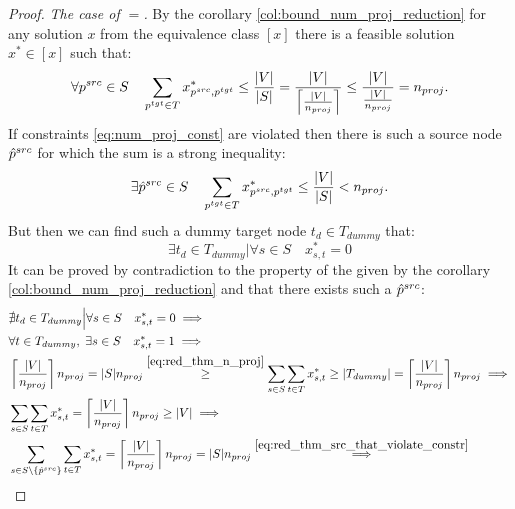 \begin{proof}
  \textit{The case of \( =\).} By the corollary \ref{col:bound_num_proj_reduction}
  for any solution \( x \) from the equivalence class \( [x] \) there is
  a feasible solution \( x^* \in [x] \) such that:
  \begin{equation} \label{eq:red_thm_n_proj}
    \forall p^{src} \in S \quad
    \sum\limits_{p^{tgt} \in T} x^*_{p^{src}, p^{tgt}} \leq \frac{|V|}{|S|} =
    \frac{|V|}{ \left\lceil \frac{|V|}{n_{proj}} \right\rceil} \leq \frac{|V|}{\frac{|V|}{n_{proj}}} =
    n_{proj} .
  \end{equation}
  If constraints \eqref{eq:num_proj_const} are violated then there is such a source node \( \hat{p}^{src} \)
  for which the sum is a strong inequality:
  \begin{equation} \label{eq:red_thm_src_that_violate_constr}
    \exists \hat{p}^{src} \in S \quad
    \sum\limits_{p^{tgt} \in T} x^*_{p^{src}, p^{tgt}} \leq \frac{|V|}{|S|} <
    n_{proj} .
  \end{equation}
  But then we can find such a dummy target node \( t_d \in T_{dummy} \) that:
  \[
    \exists t_d \in T_{dummy} \Big| \forall s \in S \quad x^*_{s,t} = 0
  \]
  It can be proved by contradiction to the property of the given by the corollary \ref{col:bound_num_proj_reduction}
  and that there exists such a \( \hat{p}^{src} \):
  \begin{align*}
    & \nexists t_d \in T_{dummy} \Big| \forall s \in S \quad x^*_{s,t} = 0 \implies                                                             \\
    & \forall t \in T_{dummy}, \; \exists s \in S \quad x^*_{s,t} = 1 \implies                                                                  \\
    & \ceil{\frac{|V|}{n_{proj}}} n_{proj} = |S| n_{proj}
    \stackrel{\eqref{eq:red_thm_n_proj}}{\geq}
    \sum\limits_{s \in S} \sum\limits_{t \in T} x^*_{s,t} \geq |T_{dummy}| = \ceil{\frac{|V|}{n_{proj}}} n_{proj} \implies                       \\
    & \sum\limits_{s \in S} \sum\limits_{t \in T} x^*_{s,t} = \ceil{\frac{|V|}{n_{proj}}} n_{proj} \geq |V|
    \implies                                                                                                                                     \\
    & \sum\limits_{s \in S \setminus \{ \src{\hat{p}} \}} \sum\limits_{t \in T} x^*_{s,t} = \ceil{\frac{|V|}{n_{proj}}} n_{proj} = |S| n_{proj}
    \stackrel{\eqref{eq:red_thm_src_that_violate_constr}}{\implies}                                                                              \\

\end{align*}
\end{proof}
